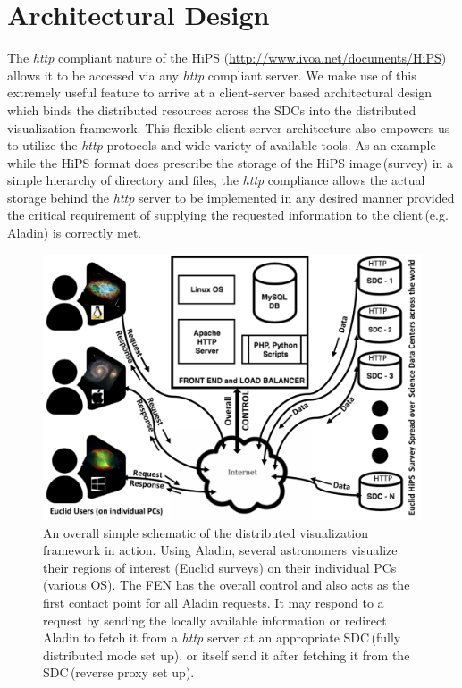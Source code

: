 \documentclass[11pt,twoside]{article}
\begin{document}
\section{Architectural Design}
\label{secn:arch_design}
The {\it{http}} compliant nature  of the HiPS  (\url{http://www.ivoa.net/documents/HiPS}) allows it to be  accessed via any {\it{http}} compliant server. We make use of this extremely useful feature to arrive at a client-server based  architectural design which binds the distributed resources across the SDCs into the distributed visualization framework. This flexible client-server  architecture also empowers us to utilize the {\it{http}} protocols and wide variety of available tools. As an example while the HiPS format does prescribe the storage of the HiPS image\,(survey) in a simple hierarchy of directory and files, the {\it{http}} compliance allows the actual storage behind the {\it{http}} server to be implemented in any desired manner provided the critical requirement of supplying the requested information to the client\,(e.g. Aladin) is correctly met. 
\begin{figure}[ht]
    \centering
   \includegraphics[width=\textwidth]{distributed_visualization_schema.png}
    \caption{An overall simple schematic of the distributed visualization framework in action. Using Aladin, several astronomers visualize their regions of interest (Euclid surveys) on their individual PCs\,(various OS). The FEN has the overall control and also acts as the first contact point for all Aladin requests. It may respond to a request by sending  the locally available information or  redirect Aladin to fetch it from a {\it{http}} server at an appropriate SDC\,(fully distributed mode set up), or itself send it after  fetching it from the SDC\,(reverse proxy set up).}
    \label{fig:dist_vis_schema}
\end{figure}
\end{document}
